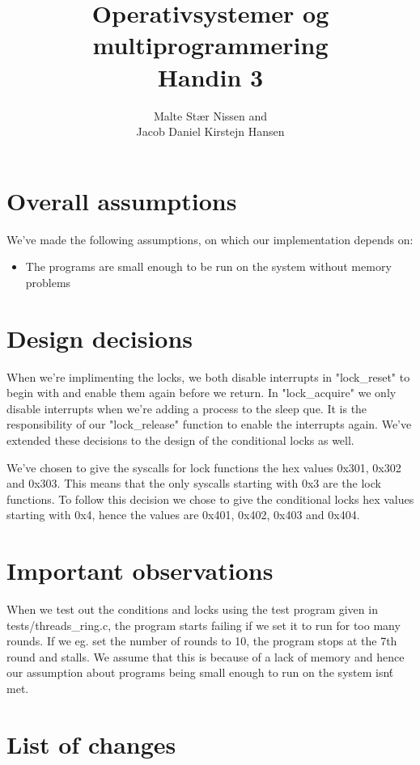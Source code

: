 \documentclass[11pt,a4paper]{article}
\title{Operativsystemer og multiprogrammering \\ Handin 3}
\author{Malte Stær Nissen and \\ 
        Jacob Daniel Kirstejn Hansen}
\begin{document}
\maketitle

\tableofcontents
\newpage

\section{Overall assumptions}
We've made the following assumptions, on which our implementation depends on: 

\begin{itemize}
\item The programs are small enough to be run on the system without memory problems
\end{itemize}

\section{Design decisions}
When we're implimenting the locks, we both disable interrupts in "lock\_reset"
to begin with and enable them again before we return. In "lock\_acquire" we
only disable interrupts when we're adding a process to the sleep que. It is the
responsibility of our "lock\_release" function to enable the interrupts again.
We've extended these decisions to the design of the conditional locks as well.

We've chosen to give the syscalls for lock functions the hex values 0x301,
0x302 and 0x303. This means that the only syscalls starting with 0x3 are the
lock functions. To follow this decision we chose to give the conditional locks
hex values starting with 0x4, hence the values are 0x401, 0x402, 0x403 and
0x404.

\section{Important observations}
When we test out the conditions and locks using the test program given in
tests/threads\_ring.c, the program starts failing if we set it to run for too
many rounds. If we eg. set the number of rounds to 10, the program stops at the
7th round and stalls. We assume that this is because of a lack of memory and
hence our assumption about programs being small enough to run on the system
isn\'t met.

\section{List of changes}
\end{document}
